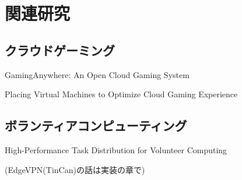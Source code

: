 \section{関連研究}

\subsection{クラウドゲーミング}

GamingAnywhere: An Open Cloud Gaming System


Placing Virtual Machines to Optimize
Cloud Gaming Experience


\subsection{ボランティアコンピューティング}
High-Performance Task Distribution for Volunteer Computing 


(EdgeVPN(TinCan)の話は実装の章で)